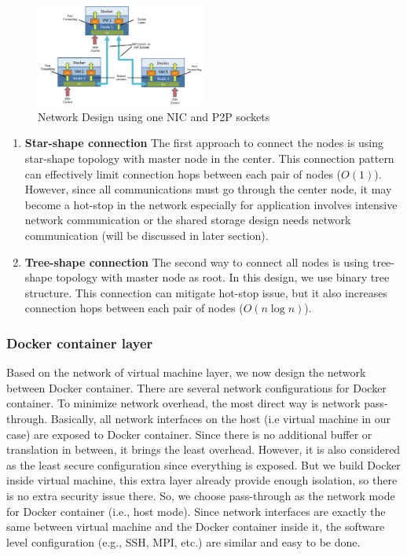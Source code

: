 \begin{figure}[h]
    \centering
    \caption{Network Design using one NIC and P2P sockets}
    \label{p2p}
    \includegraphics[width=0.5\textwidth]{figures/p2p.pdf}
\end{figure}

\begin{enumerate}
\item \textbf{Star-shape connection}
The first approach to connect the nodes is using star-shape topology with master node in the center. This connection pattern can effectively limit connection hops between each pair of nodes ($O(1)$). However, since all communications must go through the center node, it may become a hot-stop in the network especially for application involves intensive network communication or the shared storage design needs network communication (will be discussed in later section).
\item \textbf{Tree-shape connection}
The second way to connect all nodes is using tree-shape topology with master node as root. In this design, we use binary tree structure. This connection can mitigate hot-stop issue, but it also increases connection hops between each pair of nodes ($O(n\log{n})$). 
\end{enumerate}

\subsubsection{Docker container layer}
Based on the network of virtual machine layer, we now design the network between Docker container. There are several network configurations for Docker container. To minimize network overhead, the most direct way is network pass-through. Basically, all network interfaces on the host (i.e virtual machine in our case) are exposed to Docker container. Since there is no additional buffer or translation in between, it brings the least overhead. However, it is also considered as the least secure configuration since everything is exposed. But we build Docker inside virtual machine, this extra layer already provide enough isolation, so there is no extra security issue there. So, we choose pass-through as the network mode for Docker container (i.e., host mode). Since network interfaces are exactly the same between virtual machine and the Docker container inside it, the software level configuration (e.g., SSH, MPI, etc.) are similar and easy to be done.

